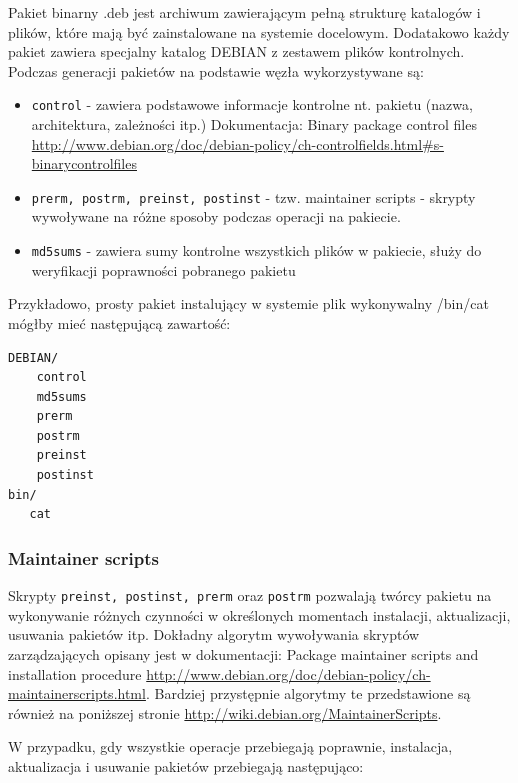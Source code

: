 \documentclass[polish,12pt]{aghthesis}
\begin{document}
Pakiet binarny .deb jest archiwum zawierającym pełną strukturę katalogów i plików, które mają być zainstalowane na systemie docelowym. Dodatakowo każdy pakiet zawiera specjalny katalog DEBIAN z zestawem plików kontrolnych. Podczas generacji pakietów na podstawie węzła wykorzystywane są:
\begin{itemize}
\item \texttt{control} - zawiera podstawowe informacje kontrolne nt. pakietu (nazwa, architektura, zależności itp.) Dokumentacja:  Binary package control files \url{http://www.debian.org/doc/debian-policy/ch-controlfields.html#s-binarycontrolfiles}
\item \texttt{prerm, postrm, preinst, postinst} - tzw. maintainer scripts - skrypty wywoływane na różne sposoby podczas operacji na pakiecie.
\item \texttt{md5sums} - zawiera sumy kontrolne wszystkich plików w pakiecie, służy do weryfikacji poprawności pobranego pakietu
\end{itemize}

Przykładowo, prosty pakiet instalujący w systemie plik wykonywalny /bin/cat mógłby mieć następującą zawartość:

\begin{lstlisting}
DEBIAN/
    control
    md5sums
    prerm
    postrm
    preinst
    postinst
bin/
   cat
\end{lstlisting}

\subsubsection{Maintainer scripts}
Skrypty \texttt{preinst, postinst, prerm} oraz \texttt{postrm} pozwalają twórcy pakietu na wykonywanie różnych czynności w określonych momentach instalacji, aktualizacji, usuwania pakietów itp. Dokładny algorytm wywoływania skryptów zarządzających opisany jest w dokumentacji: Package maintainer scripts and installation procedure \url{http://www.debian.org/doc/debian-policy/ch-maintainerscripts.html}. Bardziej przystępnie algorytmy te przedstawione są również na poniższej stronie \url{http://wiki.debian.org/MaintainerScripts}.

W przypadku, gdy wszystkie operacje przebiegają poprawnie, instalacja, aktualizacja i usuwanie pakietów przebiegają następująco:
\end{document}
